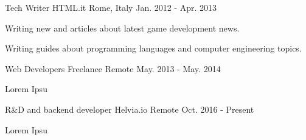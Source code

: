


\begin{cventries}


\cventry
{Tech Writer} %
{HTML.it} %
{Rome, Italy} %
{Jan. 2012 - Apr. 2013} %
{ %
\begin{cvitems}
\item {Writing new and articles about latest game development news.}
%
\item {Writing guides about programming languages and computer engineering topics.}
\end{cvitems}
}


\cventry
{Web Developers} %
{Freelance } %
{Remote} %
{May. 2013 - May. 2014} %
{ %
\begin{cvitems}
\item {Lorem Ipsu}
\end{cvitems}
}

\cventry
{R\&D and backend developer} %
{Helvia.io} %
{Remote} %
{Oct. 2016 - Present} %
{ %
\begin{cvitems}
	\item {Lorem Ipsu}
\end{cvitems}
}

\end{cventries}